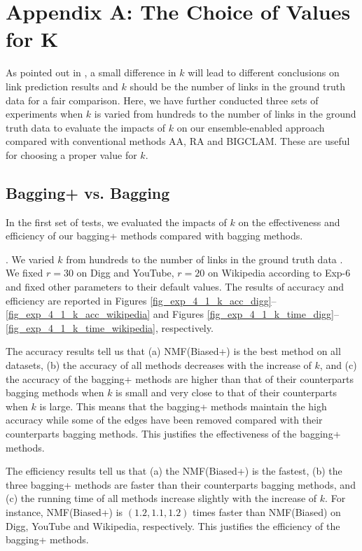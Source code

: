 \documentclass[10pt,journal,compsoc]{IEEEtran}
\newcommand{\stitle}[1]{\vspace{0.5ex}\noindent{\bf #1}}
\newcommand{\Biased}{{\sf NMF(Biased)}\xspace}
\newcommand{\Aa}{{\sf AA}\xspace }
\newcommand{\RA}{{\sf RA}\xspace }
\newcommand{\BIGCLAM}{{\sf BIGCLAM}\xspace}
\newcommand{\Digg}{{\sf Digg}\xspace}
\newcommand{\YouTube}{{\sf YouTube}\xspace}
\newcommand{\Wikipedia}{{\sf Wikipedia}\xspace}
\newcommand{\Biasedp}{{\sf NMF(Biased+)}\xspace}
\begin{document}
\section{Appendix A: The Choice of Values for K}

 As pointed out in \cite{yang2015}, a small
difference in $k$ will lead to different conclusions on link prediction results
and $k$ should be the number of links in the ground truth data for a fair
comparison. Here, we have further conducted three sets of experiments when
$k$ is varied from hundreds to the number of links in the ground truth data to evaluate
the impacts of $k$ on our ensemble-enabled approach compared with conventional methods
\Aa, \RA and \BIGCLAM. These are useful for choosing a proper value for $k$.



\subsection{Bagging+ vs. Bagging}
In the first set of tests, we evaluated the impacts of $k$ on the
effectiveness and efficiency of our bagging+ methods compared with bagging methods.

\stitle{Exp-4.1: Impacts of $k$}. We varied $k$ from hundreds
to the number of links in the ground truth data \cite{yang2015}.
We fixed $r = 30$ on \Digg and \YouTube, $r = 20$ on \Wikipedia according to Exp-6
and fixed other parameters to their default values.
The results of accuracy and efficiency are reported
in Figures \ref{fig_exp_4_1_k_acc_digg}--\ref{fig_exp_4_1_k_acc_wikipedia} and
Figures \ref{fig_exp_4_1_k_time_digg}--\ref{fig_exp_4_1_k_time_wikipedia}, respectively.

The accuracy results tell us that
(a) \Biasedp is the best method on all datasets,
(b) the accuracy of all methods decreases with the increase of $k$,
and (c) the accuracy of the bagging+ methods are higher than that of
their counterparts bagging methods when $k$ is small and very
close to that of their counterparts when $k$ is large.
This means that the bagging+ methods maintain the high accuracy while some of the
edges have been removed compared with their counterparts bagging methods.
This justifies the effectiveness of the bagging+ methods.


The  efficiency  results tell us that (a) the \Biasedp is the fastest, (b) the three bagging+ methods are faster
than their counterparts bagging methods, and (c) the running time of all
methods increase slightly with the increase of $k$. For instance,
\Biasedp is $(1.2, 1.1, 1.2)$ times faster than
\Biased on \Digg, \YouTube and \Wikipedia, respectively.
This justifies the efficiency of the bagging+ methods.
\end{document}
